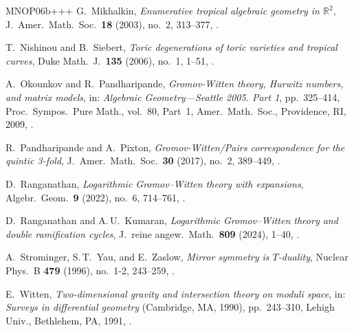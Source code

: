 \documentclass[11pt]{amsart}
\numberwithin{equation}{section}
\theoremstyle{plain}
\theoremstyle{remark}
\theoremstyle{definition}
\begin{document}
\begin{thebibliography}{MNOP06b+++}
G.~Mikhalkin, \emph{Enumerative tropical algebraic geometry in $\mathbb{R}^2$},
  J.~Amer.\ Math.\ Soc.\ \textbf{18} (2003), no.~2,
  313--377, .

T.~Nishinou and B.~Siebert, \emph{{Toric degenerations of toric varieties and
  tropical curves}}, Duke Math.~J.\ \textbf{135} (2006), no.~1, 
1--51,  .

A.~Okounkov and R.~Pandharipande, \emph{Gromov-Witten theory, {H}urwitz
  numbers, and matrix models}, in: \emph{Algebraic Geometry---{S}eattle 2005. {P}art 1}, pp.~325--414, Proc.\ Sympos.\ Pure Math., vol.~80, Part~1, Amer.\ Math.\ Soc., Providence, RI, 2009, .


R.~Pandharipande and A.~Pixton, \emph{Gromov-{W}itten/{P}airs correspondence
  for the quintic 3-fold}, J.~Amer.\ Math.\ Soc.\ \textbf{30} (2017), no.~2,
  389--449, .

D.~Ranganathan, \emph{Logarithmic Gromov--Witten theory with expansions},
  Algebr.\ Geom.\ \textbf{9} (2022), no.~6, 
714--761, .
  
D.~Ranganathan and A.\,U.~Kumaran, \emph{Logarithmic {G}romov--{W}itten theory and double ramification cycles}, J.~reine angew.\ Math.\ \textbf{809} (2024),
1--40, .

A.~Strominger, S.\,T.~Yau, and E.~Zaslow, \emph{Mirror symmetry is
  {$T$}-duality}, Nuclear Phys.~B \textbf{479} (1996), no.~1-2, 
243--259,  .

E.~Witten, \emph{Two-dimensional gravity and intersection theory on moduli
  space}, in: \emph{Surveys in differential geometry} ({C}ambridge, {MA}, 1990), pp.~243--310,  Lehigh Univ., Bethlehem, PA, 1991, .

\end{thebibliography}
\end{document}
